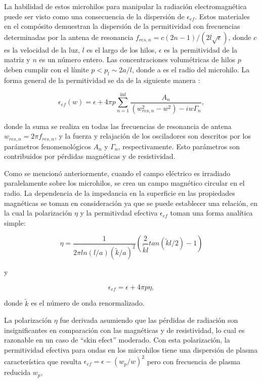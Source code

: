 \documentclass[12pt,letterpaper]{report}
\numberwithin{equation}{section}
\begin{document}
La habilidad de estos microhilos para manipular la radiación electromagnética puede ser visto como una consecuencia de la dispersión de $\epsilon_{ef}$. Estos materiales en el compósito demuestran la dispersión de la permitividad con frecuencias determinadas por la antena de resonancia $f_{res,n}= c(2n-1)/(2l\sqrt{\epsilon})$, donde $c$ es la velocidad de la luz, $l$ es el largo de los hilos, $\epsilon$ es la permitividad de la matriz y $n$ es un número entero. Las concentraciones volumétricas de hilos $p$ deben cumplir con el límite $p<p_{l} \sim 2a/l$, donde a es el radio del microhilo. La forma general de la permitividad se da de la siguiente manera \cite{Wire_theory_2}:

\begin{equation}
\epsilon_{ef} (w)=\epsilon + 4 \pi p \sum_{n=1}^{\inf} \frac{A_{n}}{(w_{res,n}^2-w^2)-iw\Gamma_{n}}, 
\end{equation}

\noindent donde la suma se realiza en todas las frecuencias de resonancia de antena $w_{res,n}=2 \pi f_{res,n}$, y la fuerza y relajación de los osciladores son descritos por los parámetros fenomenológicos $A_n$ y $\Gamma_n$, respectivamente. Esto parámetros son contribuidos por pérdidas magnéticas y de resistividad. 

Como se mencionó anteriormente, cuando el campo eléctrico es irradiado paralelamente sobre los microhilos, se crea un campo magnético circular en el radio. La dependencia de la impedancia en la superficie en las propiedades magnéticas se toman en consideración ya que se puede establecer una relación, en la cual la polarización $\eta$ y la permitivdad efectiva $\epsilon_{ef}$ toman una forma analítica simple:

\begin{equation}
\eta = \frac{1}{2 \pi ln(l/a)(\tilde{k}/a)^2} \left( \frac{2}{\tilde{k}l}tan(\tilde{k}l/2)-1\right) 
\end{equation}

y

\begin{equation}
\epsilon_{ef} = \epsilon + 4 \pi p \eta, 
\end{equation}

\noindent donde $\tilde{k}$ es el número de onda renormalizado.

La polarización $\eta$ fue derivada asumiendo que las pérdidas de radiación son insignificantes en comparación con las magnéticas y de resistividad, lo cual es razonable en un caso de ``skin efect'' moderado. Con esta polarización, la permitividad efectiva para ondas en los microhilos tiene una dispersión de plasma característica que resulta $\epsilon_{ef}= \epsilon - (w_{p}/w)^2$ pero con frecuencia de plasma reducida  $w_{p}$,
\end{document}
